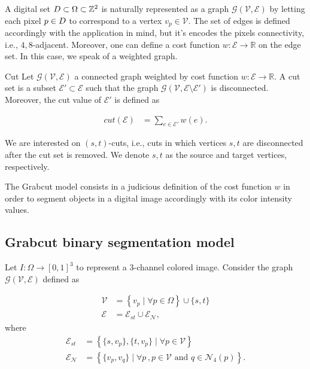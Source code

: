 A digital set $D \subset \Omega \subset \mathbb{Z}^2$ is naturally represented as a graph $\mathcal{G}(\mathcal{V},\mathcal{E})$ by letting each pixel $p \in D$ to correspond to a vertex $v_p \in \mathcal{V}$. The set of edges is defined accordingly with the application in mind, but it's encodes the pixels connectivity, i.e., $4,8$-adjacent.  Moreover, one can define a cost function $w:\mathcal{E}\rightarrow \mathbb{R}$ on the edge set. In this case, we speak of a weighted graph.

\begin{definition}{Cut}
Let $\mathcal{G}(\mathcal{V},\mathcal{E})$ a connected graph weighted  by cost function $w:\mathcal{E}\rightarrow \mathbb{R}$. A cut set is a subset $\mathcal{E}' \subset \mathcal{E}$ such that the graph $\mathcal{G}(\mathcal{V},\mathcal{E} \setminus \mathcal{E}')$ is disconnected. Moreover, the cut value of $\mathcal{E}'$ is defined as

\begin{align*}
	cut(\mathcal{E}) &= \sum_{e \in \mathcal{E}'}{w(e)}.
\end{align*}
\end{definition}

We are interested on $(s,t)$-cuts, i.e., cuts in which vertices $s,t$ are disconnected after the cut set is removed. We denote $s,t$ as the source and target vertices, respectively. 


The Grabcut model consists in a judicious definition of the cost function $w$ in order to segment objects in a digital image accordingly with its color intensity values.

\subsection{Grabcut binary segmentation model}
Let $I:\Omega\rightarrow [0,1]^3$ to represent a $3$-channel colored image. Consider the graph $\mathcal{G}(\mathcal{V},\mathcal{E})$ defined as

\begin{align*}
	\mathcal{V} &= \left\{ v_p \; | \; \forall p \in \Omega \right\} \cup \{s,t\}\\
	\mathcal{E} &= \mathcal{E}_{st} \cup \mathcal{E}_{\mathcal{N}},
\end{align*}
where 
\begin{align*}
\mathcal{E}_{st} &= \left\{ \{s,v_p\}, \{t,v_p\} \; | \; \forall p \in \mathcal{V}  \right\} \\
\mathcal{E}_{\mathcal{N}} &= \left\{ \{v_p,v_q\} \; | \; \forall p\,, p \in \mathcal{V} \text{ and } q\in \mathcal{N}_4(p)  \right\}.
\end{align*}

